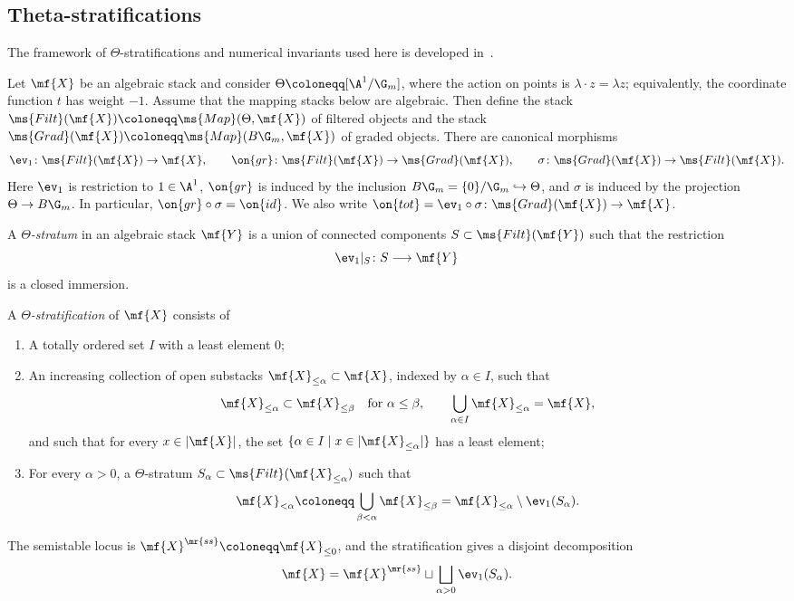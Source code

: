 \subsection{Theta-stratifications}%
\label{sub:Theta-stratifications}

The framework of \(\Theta\)-stratifications and numerical invariants used here is developed in~\cite{HLinstability}.

Let \(\mf{X}\) be an algebraic stack and consider \(\Theta\coloneqq[\A^1/\G_m]\), where the action on points is \(\lambda\cdot z=\lambda z\); equivalently, the coordinate function \(t\) has weight \(-1\). Assume that the mapping stacks below are algebraic. Then define the stack \(\ms{Filt}(\mf{X})\coloneqq\ms{Map}(\Theta,\mf{X})\) of filtered objects and the stack \(\ms{Grad}(\mf{X})\coloneqq\ms{Map}(B\G_m,\mf{X})\) of graded objects. There are canonical morphisms
\[
    \ev_1\colon\ms{Filt}(\mf{X})\to\mf{X},
    \qquad
    \on{gr}\colon\ms{Filt}(\mf{X})\to\ms{Grad}(\mf{X}),
    \qquad
    \sigma\colon\ms{Grad}(\mf{X})\to\ms{Filt}(\mf{X}).
\]
Here \(\ev_1\) is restriction to \(1\in\A^1\), \(\on{gr}\) is induced by the inclusion \(B\G_m=\{0\}/\G_m\hookrightarrow\Theta\), and \(\sigma\) is induced by the projection \(\Theta\to B\G_m\). In particular, \(\on{gr}\circ\sigma=\on{id}\). We also write \(\on{tot}=\ev_1\circ\sigma\colon\ms{Grad}(\mf{X})\to\mf{X}\).

\begin{defn}
    A \textit{\(\Theta\)-stratum} in an algebraic stack \(\mf{Y}\) is a union of connected components \(S\subset\ms{Filt}(\mf{Y})\) such that the restriction
    \[
        \ev_1|_S\colon S\longrightarrow\mf{Y}
    \]
    is a closed immersion.

    A \textit{\(\Theta\)-stratification} of \(\mf{X}\) consists of
    \begin{enumerate}
        \item A totally ordered set \(I\) with a least element \(0\);
        \item An increasing collection of open substacks \(\mf{X}_{\leq\alpha}\subset\mf{X}\), indexed by \(\alpha\in I\), such that
        \[
            \mf{X}_{\leq\alpha}\subset\mf{X}_{\leq\beta}
            \quad\text{for }\alpha\leq\beta,
            \qquad
            \bigcup_{\alpha\in I}\mf{X}_{\leq\alpha}=\mf{X},
        \]
        and such that for every \(x\in|\mf{X}|\), the set \(\{\alpha\in I\mid x\in|\mf{X}_{\leq\alpha}|\}\) has a least element;
        \item For every \(\alpha>0\), a \(\Theta\)-stratum \(S_\alpha\subset\ms{Filt}(\mf{X}_{\leq\alpha})\) such that
        \[
            \mf{X}_{<\alpha}
            \coloneqq
            \bigcup_{\beta<\alpha}\mf{X}_{\leq\beta}
            =
            \mf{X}_{\leq\alpha}\setminus\ev_1(S_\alpha).
        \]
    \end{enumerate}
    The semistable locus is \(\mf{X}^{\mr{ss}}\coloneqq\mf{X}_{\leq0}\), and the stratification gives a disjoint decomposition
    \[
        \mf{X}
        =
        \mf{X}^{\mr{ss}}
        \sqcup
        \bigsqcup_{\alpha>0}\ev_1(S_\alpha).
    \]
\end{defn}

